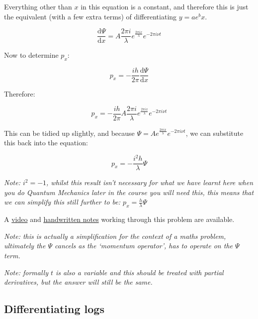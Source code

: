 \documentclass[
]{book}
\begin{document}
Everything other than \(x\) in this equation is a constant, and therefore this is just the equivalent (with a few extra terms) of differentiating \(y = ae^bx\).

\begin{equation*}
\frac{\textrm{d}\Psi}{\textrm{d}x} = A \frac{2 \pi i}{\lambda}e^{\frac{2 \pi i x}{\lambda}} e^{-2 \pi i \nu t}
\end{equation*}

Now to determine \(p_x\):

\begin{equation*}
p_x=-\frac{ih}{2 \pi}\frac{\textrm{d}\Psi}{\textrm{d}x}
\end{equation*}

Therefore:

\begin{equation*}
p_x=-\frac{ih}{2 \pi}A \frac{2 \pi i}{\lambda}e^{\frac{2 \pi i x}{\lambda}} e^{-2 \pi i \nu t}
\end{equation*}

This can be tidied up slightly, and because \(\Psi = A e^{\frac{2 \pi i x}{\lambda}} e^{-2 \pi i \nu t}\), we can substitute this back into the equation:

\begin{equation*}
p_x=-\frac{i^2h}{\lambda} \Psi
\end{equation*}

\emph{Note: \(i^2=-1\), whilst this result isn't necessary for what we have learnt here when you do Quantum Mechanics later in the course you will need this, this means that we can simplify this still further to be: \(p_x=\frac{h}{\lambda} \Psi\)}

A \href{https://youtu.be/sMHjcbsNsv8}{video} and \href{http://workitoutwithapencil.xyz/wp-content/uploads/2021/08/Ex7.15.5-Determining-momentum-of-a-wave-particle.pdf}{handwritten notes} working through this problem are available.

\emph{Note: this is actually a simplification for the context of a maths problem, ultimately the \(\Psi\) cancels as the `momentum operator', has to operate on the \(\Psi\) term.}

\emph{Note: formally \(t\) is also a variable and this should be treated with partial derivatives, but the answer will still be the same.}

\hypertarget{subsec:exdifflogs}{%
\subsection{Differentiating logs}\label{subsec:exdifflogs}}
\end{document}
